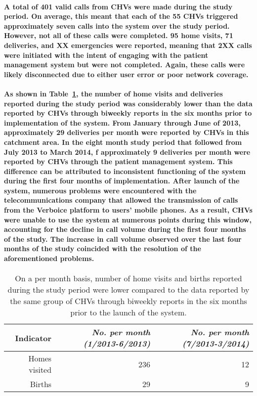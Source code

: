 \paragraph{A total of 401 valid calls from CHVs were made during the study period. On average, this meant that each of the 55 CHVs triggered approximately seven calls into the system over the study  period. However, not all of these calls were completed. 95 home visits, 71 deliveries, and XX emergencies were reported, meaning that 2XX calls were initiated with the intent of engaging with the patient management system but were not completed. Again, these calls were likely disconnected due to either user error or poor network coverage.}

\paragraph{As shown in Table~\ref{tab:usagevsreport}, the number of home visits and deliveries reported during the study period was considerably lower than the data reported by CHVs through biweekly reports in the six months prior to implementation of the system. From January through June of 2013,  approximately 29 deliveries per month were reported by CHVs in this catchment area. In the eight month study period that followed from July 2013 to March 2014, f approximately 9 deliveries per month were reported by CHVs through the patient management system. This difference can be attributed to inconsistent functioning of the system during the first four months of implementation. After launch of the system, numerous problems were encountered with the telecommunications company that allowed the transmission of calls from the Verboice platform to users' mobile phones. As a result, CHVs were unable to use the system at numerous points during this window, accounting for the decline in call volume during the first four months of the study. The increase in call volume observed over the last four months of the study coincided with the resolution of the aforementioned problems.}

\begin{table}[h]
  \centering
  \caption[Comparison of CHV report data from biweekly reports vs. patient management system reports]{On a per month basis, number of home visits and births reported during the study period were lower compared to the data reported by the same group of CHVs through biweekly reports in the six months prior to the launch of the system.}
    \begin{tabular}{rrr}
    \toprule
    \textbf{Indicator} & \textit{No. per month (1/2013-6/2013)} & \textit{No. per month (7/2013-3/2014)} \\
    \midrule
    Homes visited & 236   & 12 \\
    Births & 29    & 9 \\
    \bottomrule
    \end{tabular}%
  \label{tab:usagevsreport}%
\end{table}%

